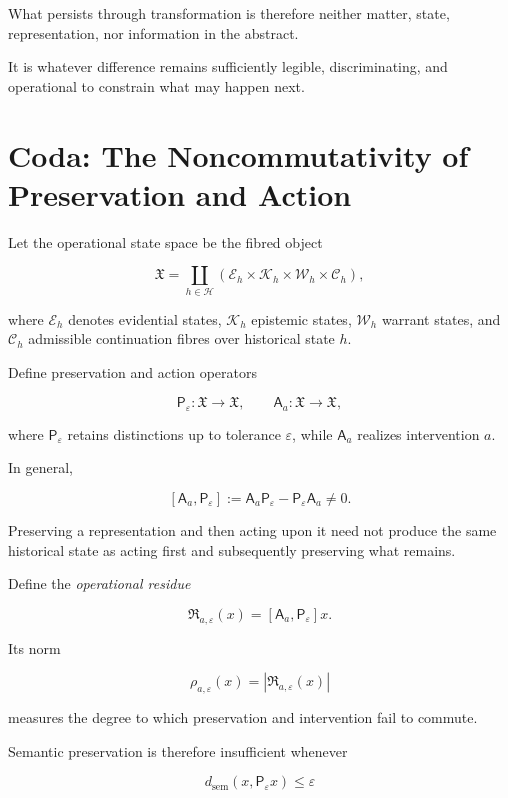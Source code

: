 \documentclass[11pt]{article}
\begin{document}
What persists through transformation is therefore neither matter, state, representation, nor information in the abstract.

It is whatever difference remains sufficiently legible, discriminating, and operational to constrain what may happen next.

\section{Coda: The Noncommutativity of Preservation and Action}

Let the operational state space be the fibred object

\[
\mathfrak X
=
\coprod_{h\in\mathcal H}
\left(
\mathcal E_h
\times
\mathcal K_h
\times
\mathcal W_h
\times
\mathcal C_h
\right),
\]

where $\mathcal E_h$ denotes evidential states,
$\mathcal K_h$ epistemic states,
$\mathcal W_h$ warrant states, and
$\mathcal C_h$ admissible continuation fibres over historical state $h$.

Define preservation and action operators

\[
\mathsf P_\varepsilon :
\mathfrak X\rightarrow\mathfrak X,
\qquad
\mathsf A_a :
\mathfrak X\rightarrow\mathfrak X,
\]

where $\mathsf P_\varepsilon$ retains distinctions up to tolerance
$\varepsilon$, while $\mathsf A_a$ realizes intervention $a$.

In general,

\[
\boxed{
[\mathsf A_a,\mathsf P_\varepsilon]
:=
\mathsf A_a\mathsf P_\varepsilon
-
\mathsf P_\varepsilon\mathsf A_a
\neq 0.
}
\]

Preserving a representation and then acting upon it need not produce the same
historical state as acting first and subsequently preserving what remains.

Define the \emph{operational residue}

\[
\mathfrak R_{a,\varepsilon}(x)
=
[\mathsf A_a,\mathsf P_\varepsilon]x.
\]

Its norm

\[
\rho_{a,\varepsilon}(x)
=
\left|
\mathfrak R_{a,\varepsilon}(x)
\right|
\]

measures the degree to which preservation and intervention fail to commute.

Semantic preservation is therefore insufficient whenever

\[
d_{\mathrm{sem}}
\left(
x,\mathsf P_\varepsilon x
\right)
\leq\varepsilon
\]
\end{document}
